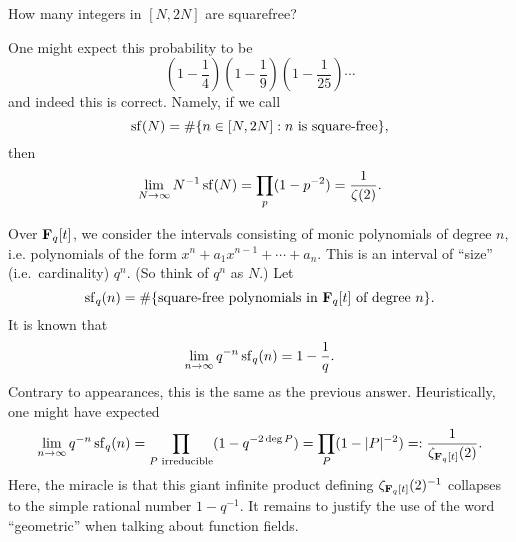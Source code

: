 \begin{question}
How many integers in $[N,2 N]$ are squarefree?
\end{question}

One might expect this probability to be 
\[
  \left(1-\frac 1 4\right)\left(1-\frac 1 9\right)\left(1-\frac{1}{25}\right) \cdots 
\]
and indeed this is correct. Namely, if we call 
\[
  \operatorname{sf}(N) = \#\{n\in [N, 2 N]:n\text{ is square-free}\} ,
\]
then 
\[
  \lim_{N\to \infty} N^{-1} \operatorname{sf}(N) = \prod_p (1-p^{-2}) = \frac{1}{\zeta(2)} .
\]

Over $\mathbf{F}_q[t]$, we consider the intervals consisting of monic polynomials of 
degree $n$, i.e. polynomials of the form 
$x^n+ a_1 x^{n-1} + \cdots + a_n$. This is an interval of ``size'' (i.e.\ 
cardinality) $q^n$. (So think of $q^n$ as $N$.) Let 
\[
  \operatorname{sf}_q(n) = \#\{\text{square-free polynomials in }\mathbf{F}_q[t]\text{ of degree $n$}\} .
\]
It is known that 
\[
  \lim_{n\to \infty} q^{-n} \operatorname{sf}_q(n) = 1 - \frac 1 q .
\]
Contrary to appearances, this is the same as the previous answer. 
Heuristically, one might have expected 
\[
  \lim_{n\to \infty} q^{-n} \operatorname{sf}_q(n) = \prod_{P\text{ irreducible}} (1-q^{-2\deg P}) = \prod_P (1-|P|^{-2}) =: \frac{1}{\zeta_{\mathbf{F}_q[t]}(2)} .
\]
Here, the miracle is that this giant infinite product defining 
$\zeta_{\mathbf{F}_q[t]}(2)^{-1}$ collapses to the simple rational number 
$1-q^{-1}$. It remains to justify the use of the word ``geometric'' when 
talking about function fields. 




